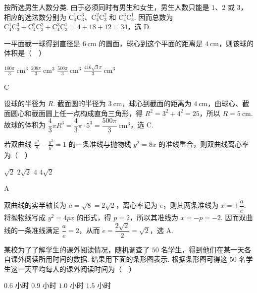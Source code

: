 \begin{solution}
按所选男生人数分类. 由于必须同时有男生和女生，男生人数只能是 \(1\)、\(2\) 或 \(3\)，相应的选法数分别为 \(\mathrm C_4^1\mathrm C_3^3\)、\(\mathrm C_4^2\mathrm C_3^2\) 和 \(\mathrm C_4^3\mathrm C_3^1\). 因而总数为 \(\mathrm C_4^1\mathrm C_3^3+\mathrm C_4^2\mathrm C_3^2+\mathrm C_4^3\mathrm C_3^1=4+18+12=34\)，选 D.
\end{solution}

\begin{problem}
一平面截一球得到直径是 \(6 \mathrm{~cm}\) 的圆面，球心到这个平面的距离是 \(4 \mathrm{~cm}\)，则该球的体积是（\(\quad\)）

\choices
    {\(\frac{100\pi}{3} \mathrm{~cm}^{3}\)}
    {\(\frac{208\pi}{3} \mathrm{~cm}^{3}\)}
    {\(\frac{500\pi}{3} \mathrm{~cm}^{3}\)}
    {\(\frac{416\sqrt{3}\pi}{3} \mathrm{~cm}^{3}\)}
\end{problem}

\begin{answer}
C
\end{answer}

\begin{solution}
设球的半径为 \(R\). 截面圆的半径为 \(3\mathrm{~cm}\)，球心到截面的距离为 \(4\mathrm{~cm}\)，由球心、截面圆心和截面圆上任一点构成直角三角形，得 \(R^2=3^2+4^2=25\)，所以 \(R=5\mathrm{~cm}\). 故球的体积为 \(\dfrac43\pi R^3=\dfrac43\pi\cdot5^3=\dfrac{500\pi}{3}\mathrm{~cm}^3\)，选 C.
\end{solution}

\begin{problem}
若双曲线 \(\frac{x^2}{8} - \frac{y^2}{b^2} = 1\) 的一条准线与抛物线 \(y^2 = 8x\) 的准线重合，则双曲线离心率为（\(\quad\)）

\choices
    {\(\sqrt{2}\)}
    {\(2 \sqrt{2}\)}
    {\(4\)}
    {\(4\sqrt{2}\)}
\end{problem}

\begin{answer}
A
\end{answer}

\begin{solution}
双曲线的实半轴长为 \(a=\sqrt8=2\sqrt2\)，离心率记为 \(e\)，则其两条准线为 \(x=\pm\dfrac{a}{e}\). 将抛物线写成 \(y^2=4px\) 的形式，得 \(p=2\)，所以其准线为 \(x=-p=-2\). 因而双曲线的一条准线满足 \(\dfrac{a}{e}=2\)，从而 \(e=\dfrac{2\sqrt2}{2}=\sqrt2\)，选 A.
\end{solution}

\begin{problem}
某校为了了解学生的课外阅读情况，随机调查了 \(50\) 名学生，得到他们在某一天各自课外阅读所用时间的数据. 结果用下面的条形图表示. 根据条形图可得这 \(50\) 名学生这一天平均每人的课外阅读时间为（\(\quad\)）


\choices
    {\(0.6\text{ 小时}\)}
    {\(0.9\text{ 小时}\)}
    {\(1.0\text{ 小时}\)}
    {\(1.5\text{ 小时}\)}
\end{problem}

